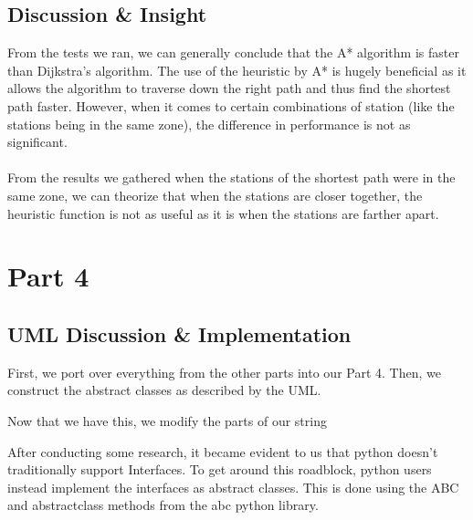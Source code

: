 \documentclass{article}
\begin{document}
\subsection{Discussion \& Insight}

From the tests we ran, we can generally conclude that the A* algorithm is faster than Dijkstra’s algorithm. The use of the heuristic by A* is hugely beneficial as it allows the algorithm to traverse down the right path and thus find the shortest path faster. However, when it comes to certain combinations of station (like the stations being in the same zone), the difference in performance is not as significant. \\
\\
From the results we gathered when the stations of the shortest path were in the same zone, we can theorize that when the stations are closer together, the heuristic function is not as useful as it is when the stations are farther apart.\\

\newpage
\section{Part 4}
\subsection{UML Discussion \& Implementation}

First, we port over everything from the other parts into our Part 4. Then, we construct the abstract classes as described by the UML.

Now that we have this, we modify the parts of our string


After conducting some research, it became evident to us that python doesn't traditionally support Interfaces. 
To get around this roadblock, python users instead implement the interfaces as abstract classes.
This is done using the ABC and abstractclass methods from the abc python library. 
\end{document}
